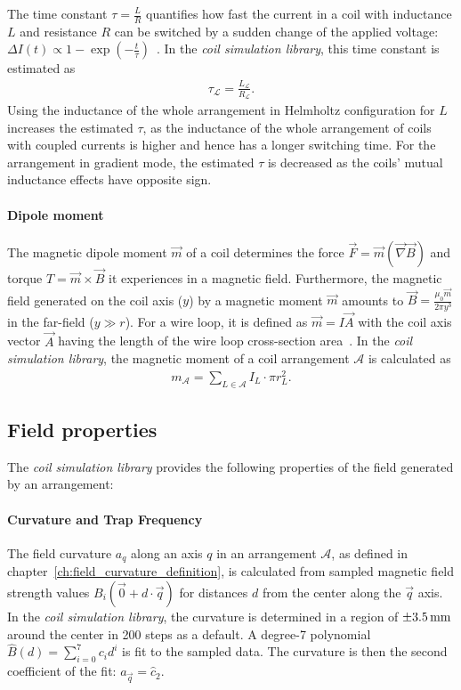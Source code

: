 The time constant $\tau = \frac{L}{R}$ quantifies how fast the current in a coil with inductance $L$ and resistance $R$ can be switched by a sudden change of the applied voltage: $\Delta I(t) \propto 1-\exp \left(-\frac{t}{\tau}\right)$~\cite{demtroder_zeitlich_2013}. In the \textit{coil simulation library}, this time constant is estimated as
\begin{align}\label{eq:time_constant_simulation}
    \tau_\mathcal{L} = \frac{L_\mathcal{L}}{R_\mathcal{L}}.
\end{align}
Using the inductance of the whole arrangement in Helmholtz configuration for $L$ increases  the estimated $\tau$, as the inductance of the whole arrangement of coils with coupled currents is higher and hence has a longer switching time. For the arrangement in gradient mode, the estimated $\tau$ is decreased as the coils' mutual inductance effects have opposite sign.

\paragraph{Dipole moment}
The magnetic dipole moment $\vec m$ of a coil determines the force $\vec F = \vec m (\vec \nabla \vec B)$ and torque $T = \vec m \times \vec B$ it experiences in a magnetic field. Furthermore, the magnetic field generated on the coil axis ($y$) by a magnetic moment $\vec m$ amounts to $\vec B = \frac{\mu_0 \vec m}{2\pi y^3}$ in the far-field ($y \gg r$). For a wire loop, it is defined as $\vec m = I \vec A$ with the coil axis vector $\vec A$ having the length of the wire loop cross-section area~\cite{demtroder_statische_2013}. In the \textit{coil simulation library}, the magnetic moment of a coil arrangement $\mathcal{A}$ is calculated as
\begin{align}\label{eq:dipole_moment_simulation}
    m_\mathcal{A} = \sum\limits_{L \in \mathcal{A}} I_L \cdot \pi r_L^2.
\end{align}

\subsection*{Field properties}
The \textit{coil simulation library} provides the following properties of the field generated by an arrangement:

\paragraph{Curvature and Trap Frequency}
The field curvature $a_q$ along an axis $q$ in an arrangement $\mathcal{A}$, as defined in chapter~\ref{ch:field_curvature_definition}, is calculated from sampled magnetic field strength values $B_i(\vec 0 + d \cdot \vec q)$ for distances $d$ from the center along the $\vec q$ axis. In the \textit{coil simulation library}, the curvature is determined in a region of $\SI{+-3.5}{\milli\meter}$ around the center in \SI{200}{} steps as a default. A degree-7 polynomial $\hat B(d) = \sum\limits_{i=0}^7 c_i d^i$ is fit to the sampled data. The curvature is then the second coefficient of the fit: $a_{\vec q} = \hat c_2$.

